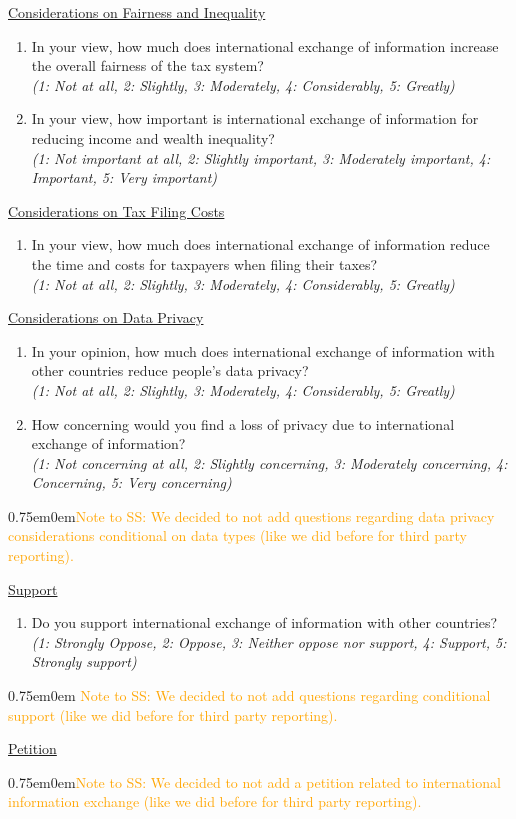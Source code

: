\documentclass[11pt]{article}
\newcommand{\tk}[1]{\textcolor{orange}{#1}}
\begin{document}
\underline{Considerations on Fairness and Inequality}
\begin{enumerate}[resume]
    \item In your view, how much does international exchange of information increase the overall fairness of the tax system? \\
    \textit{(1: Not at all, 2: Slightly, 3: Moderately, 4: Considerably, 5: Greatly)} 
    \item In your view, how important is international exchange of information for reducing income and wealth inequality?\\
    \textit{(1: Not important at all, 2: Slightly important, 3: Moderately important, 4: Important, 5: Very important)}
\end{enumerate}
\underline{Considerations on Tax Filing Costs}
\begin{enumerate}[resume]
    \item In your view, how much does international exchange of information reduce the time and costs for taxpayers when filing their taxes?\\
    \textit{(1: Not at all, 2: Slightly, 3: Moderately, 4: Considerably, 5: Greatly)}
\end{enumerate}
\underline{Considerations on Data Privacy}
\begin{enumerate}[resume]
    \item In your opinion, how much does international exchange of information with other countries reduce people's data privacy? \\
    \textit{(1: Not at all, 2: Slightly, 3: Moderately, 4: Considerably, 5: Greatly)} 
    \item How concerning would you find a loss of privacy due to international exchange of information? \\ 
    \textit{(1: Not concerning at all, 2: Slightly concerning, 3: Moderately concerning, 4: Concerning, 5: Very concerning)}
\end{enumerate}
\begin{adjustwidth}{0.75em}{0em}\tk{Note to SS: We decided to not add questions regarding data privacy considerations conditional on data types (like we did before for third party reporting).}\end{adjustwidth} 
\underline{Support}
\begin{enumerate}[resume]
    \item Do you support international exchange of information with other countries? \\
    \textit{(1: Strongly Oppose, 2: Oppose, 3: Neither oppose nor support, 4: Support, 5: Strongly support)}
\end{enumerate}
\begin{adjustwidth}{0.75em}{0em} \tk{Note to SS: We decided to not add questions regarding conditional support (like we did before for third party reporting).}\end{adjustwidth} 
\underline{Petition} 
\vspace{0.5em}
\begin{adjustwidth}{0.75em}{0em}\tk{Note to SS: We decided to not add a petition related to international information exchange (like we did before for third party reporting).}\end{adjustwidth}
\end{document}
